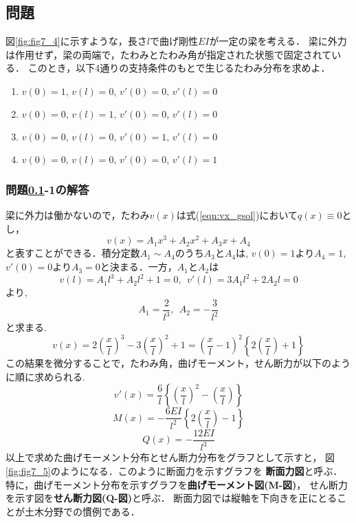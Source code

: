 \documentclass[10pt,a4j]{jbook}
\begin{document}
\subsection{問題}\label{prb}
図\ref{fig:fig7_4}に示すような，長さ$l$で曲げ剛性$EI$が一定の梁を考える．
梁に外力は作用せず，梁の両端で，たわみとたわみ角が指定された状態で固定されている．
このとき，以下4通りの支持条件のもとで生じるたわみ分布を求めよ．
\begin{enumerate}
\item
$v(0)=1,\, v(l)=0,\, v'(0)=0,\, v'(l)=0$
\item
$v(0)=0,\, v(l)=1,\, v'(0)=0,\, v'(l)=0$
\item
$v(0)=0,\, v(l)=0,\, v'(0)=1,\, v'(l)=0$
\item
$v(0)=0,\, v(l)=0,\, v'(0)=0,\, v'(l)=1$
\end{enumerate}
\subsubsection*{問題\ref{prb}-1の解答}
梁に外力は働かないので，たわみ$v(x)$は式(\ref{eqn:vx_gsol})において$q(x)\equiv 0$とし，
\begin{equation}
	v(x)=A_1 x^3 +A_2x^2 + A_3x + A_4
\end{equation}
と表すことができる．積分定数$A_1\sim A_4$のうち$A_3$と$A_4$は, $v(0)=1$より$A_4=1$,
$v'(0)=0$より$A_3=0$と決まる．一方，$A_1$と$A_2$は
\[
	v(l)=A_1l^3+A_2l^2+1=0, \ \ 
	v'(l)=3A_1l^2+2A_2l=0
\]
より, 
\[
	A_1=\frac{2}{l^3}, \ \ A_2=-\frac{3}{l^2}
\]
と求まる.
\[
	v(x)=
	2\left(\frac{x}{l}\right)^3
	-
	3\left(\frac{x}{l}\right)^2
	+
	1
	=\left(\frac{x}{l}-1\right)^2\left\{ 2\left(\frac{x}{l}\right)+1\right\}
\]
この結果を微分することで，たわみ角，曲げモーメント，せん断力が以下のように順に求められる.
\[
	v'(x)=\frac{6}{l}\left\{ \left(\frac{x}{l}\right)^2-\left(\frac{x}{l} \right) \right\}
\]
\[
	M(x)=-\frac{6EI}{l^2}\left\{ 2\left(\frac{x}{l}\right)-1 \right\}
\]
\[
	Q(x)=-\frac{12EI}{l^3}
\]
以上で求めた曲げモーメント分布とせん断力分布をグラフとして示すと，
図\ref{fig:fig7_5}のようになる．このように断面力を示すグラフを
{\bf 断面力図}と呼ぶ．特に，曲げモーメント分布を示すグラフを{\bf 曲げモーメント図(M-図)}，
せん断力を示す図を{\bf せん断力図(Q-図)}と呼ぶ．
断面力図では縦軸を下向きを正にとることが土木分野での慣例である．
\end{document}
